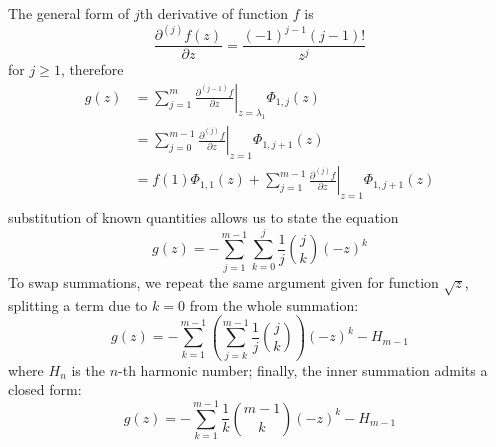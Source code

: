 
The general form of $j$th derivative of function $f$ is 
$$\frac{\partial^{(j)}{f}(z)}{\partial{z}} =\frac{(-1)^{j-1}(j-1)!}{z^{j}}  $$ 
for $j \geq 1$, therefore
\begin{displaymath}
\begin{split}
  g(z) &= \sum_{j=1}^{m}{ \left. \frac{\partial^{(j-1)}{f}}{\partial{z}} \right|_{z=\lambda_{1}}\Phi_{1,j}(z)} \\
       &= \sum_{j=0}^{m-1}{ \left. \frac{\partial^{(j)}{f}}{\partial{z}} \right|_{z=1}\Phi_{1,j+1}(z)} \\
       &= f(1)\Phi_{1,1}(z) + \sum_{j=1}^{m-1}{ \left. \frac{\partial^{(j)}{f}}{\partial{z}} \right|_{z=1}\Phi_{1,j+1}(z)} \\
\end{split}
\end{displaymath}
substitution of known quantities allows us to state the equation
\begin{equation}
  g(z) = - \sum_{j=1}^{m-1}{\sum_{k=0}^{j}{\frac{1}{j}{{j}\choose{k}}(-z)^{k}}}
\end{equation}
To swap summations, we repeat the same argument given for function $\sqrt{z}$, splitting
a term due to $k=0$ from the whole summation:
\begin{equation}
  g(z) = - \sum_{k=1}^{m-1}{\left(\sum_{j=k}^{m-1}{\frac{1}{j}{{j}\choose{k}}}\right)}(-z)^{k} - H_{m-1} 
\end{equation}
where $H_{n}$ is the $n$-th harmonic number; finally, the inner summation admits
a closed form:
\begin{equation}
  g(z) = - \sum_{k=1}^{m-1}\frac{1}{k}{{m-1}\choose{k}}{(-z)^{k}}- H_{m-1} 
\end{equation}

